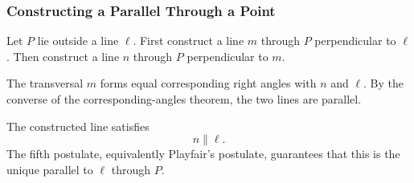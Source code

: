 \subsubsection{Constructing a Parallel Through a Point}

\begin{derivationbox}[Construction]
Let $P$ lie outside a line $\ell$. First construct a line $m$ through $P$
perpendicular to $\ell$. Then construct a line $n$ through $P$ perpendicular
to $m$.

The transversal $m$ forms equal corresponding right angles with $n$ and
$\ell$. By the converse of the corresponding-angles theorem, the two lines are
parallel.
\end{derivationbox}

\begin{theorembox}
The constructed line satisfies
\[
\boxed{n\parallel\ell}.
\]
The fifth postulate, equivalently Playfair's postulate, guarantees that this is
the unique parallel to $\ell$ through $P$.
\end{theorembox}
